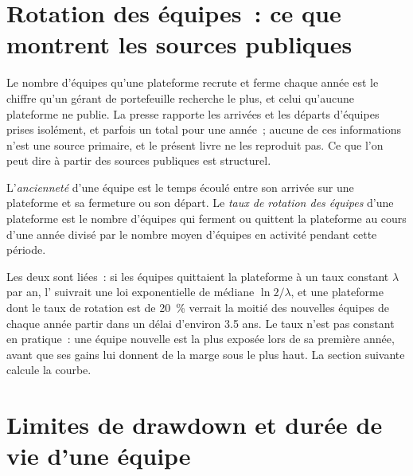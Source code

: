 \section{Rotation des équipes~: ce que montrent les sources publiques}

Le nombre d'équipes qu'une plateforme recrute et ferme chaque année est le chiffre qu'un gérant de portefeuille recherche le plus, et celui qu'aucune
plateforme ne publie. La presse rapporte les arrivées et les départs d'équipes prises isolément, et parfois un total pour une année~;
aucune de ces informations n'est une source primaire, et le présent livre ne les reproduit pas. Ce que l'on peut dire à partir des sources publiques est structurel.

\begin{definition}\label{def:in:multi-manager-platforms:tenure}
L'\emph{ancienneté} d'une équipe est le temps écoulé entre son arrivée sur une plateforme et sa fermeture ou son départ. Le
\emph{taux de rotation des équipes} d'une plateforme est le nombre d'équipes qui ferment ou quittent la plateforme au cours d'une année
divisé par le nombre moyen d'équipes en activité pendant cette période.
\end{definition}

Les deux sont liées~: si les équipes quittaient la plateforme à un taux constant $\lambda$ par an, l' suivrait une loi exponentielle de médiane
$\ln 2/\lambda$, et une plateforme dont le taux de rotation est de 20~\% verrait la moitié des nouvelles équipes de chaque année partir dans un délai d'environ
3.5 ans. Le taux n'est pas constant en pratique~: une équipe nouvelle est la plus exposée lors de sa première année, avant que ses gains lui
donnent de la marge sous le plus haut. La section suivante calcule la courbe.

\section{Limites de drawdown et durée de vie d'une équipe}

